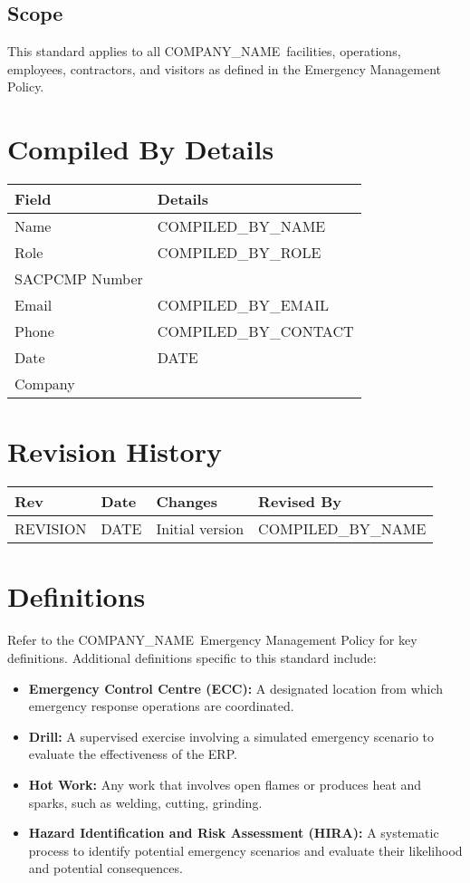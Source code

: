 \documentclass[11pt]{article}
\newcommand{\issueDate}{{{DATE}}}
\newcommand{\clientName}{{{COMPANY_NAME}}}
\newcommand{\compilerName}{{{COMPILED_BY_NAME}}}
\newcommand{\compilerRole}{{{COMPILED_BY_ROLE}}}
\newcommand{\compilerSACPCMP}{}
\newcommand{\compilerEmail}{{{COMPILED_BY_EMAIL}}}
\newcommand{\compilerPhone}{{{COMPILED_BY_CONTACT}}}
\newcommand{\compilerCompany}{}
\newcommand{\revision}{{{REVISION}}}
\begin{document}
\subsection{Scope}
This standard applies to all \clientName\ facilities, operations, employees, contractors, and visitors as defined in the Emergency Management Policy.

\section{Compiled By Details}
\begin{tabularx}{\textwidth}{lX}
  \toprule
  \textbf{Field} & \textbf{Details} \\
  \midrule
  Name & \compilerName \\
  Role & \compilerRole \\
  SACPCMP Number & \compilerSACPCMP \\
  Email & \compilerEmail \\
  Phone & \compilerPhone \\
  Date & \issueDate \\
  Company & \compilerCompany \\
  \bottomrule
\end{tabularx}

\section{Revision History}
\begin{tabularx}{\textwidth}{lXll}
  \toprule
  \textbf{Rev} & \textbf{Date} & \textbf{Changes} & \textbf{Revised By} \\
  \midrule
  \revision & \issueDate & Initial version & \compilerName \\
  \bottomrule
\end{tabularx}

\section{Definitions}
Refer to the \clientName\ Emergency Management Policy for key definitions. Additional definitions specific to this standard include:
\begin{itemize}
    \item \textbf{Emergency Control Centre (ECC):} A designated location from which emergency response operations are coordinated.
    \item \textbf{Drill:} A supervised exercise involving a simulated emergency scenario to evaluate the effectiveness of the ERP.
    \item \textbf{Hot Work:} Any work that involves open flames or produces heat and sparks, such as welding, cutting, grinding.
    \item \textbf{Hazard Identification and Risk Assessment (HIRA):} A systematic process to identify potential emergency scenarios and evaluate their likelihood and potential consequences.
\end{itemize}
\end{document}

